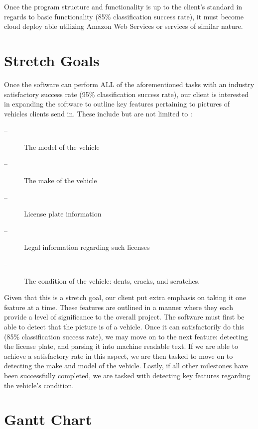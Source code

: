 \documentclass[onecolumn, draftclsnofoot,10pt, compsoc]{IEEEtran}
\begin{document}
Once the program structure and functionality is up to the client's standard in regards to basic functionality (85\% classification success rate), it must become cloud deploy able utilizing Amazon Web Services or services of similar nature. 

\section{Stretch Goals}
	
	Once the software can perform ALL of the aforementioned tasks with an industry satisfactory success rate (95\% classification success rate), our client is interested in expanding the software to outline key features pertaining to pictures of vehicles clients send in. These include but are not limited to :
\begin{description}
	\item[--]The model of the vehicle
	\item[--]The make of the vehicle 
	\item[--]License plate information
	\item[--]Legal information regarding such licenses
	\item[--]The condition of the vehicle: dents, cracks, and scratches.
\end{description}

Given that this is a stretch goal, our client put extra emphasis on taking it one feature at a time. These features are outlined in a manner where they each provide a level of significance to the overall project. The software must first be able to detect that the picture is of a vehicle.  Once it can satisfactorily do this (85\% classification success rate), we may move on to the next feature: detecting the license plate, and parsing it into machine readable text. If we are able to achieve a satisfactory rate in this aspect, we are then tasked to move on to detecting the make and model of the vehicle. Lastly, if all other milestones have been successfully completed, we are tasked with detecting key features regarding the vehicle's condition. 

\section{Gantt Chart}
\end{document}
